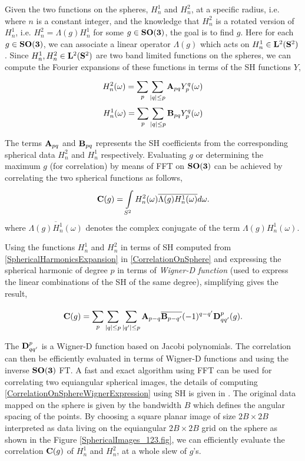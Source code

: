 \documentclass{UCF_ETD}
\begin{document}
Given the two functions on the spheres, $H^1_n$ and $H^2_n$, at a specific radius, i.e. where $n$ is a constant integer, and the knowledge that $H^2_n$ is a rotated version of $H^1_n$, i.e. $ H^2_n = \Lambda(g) H^1_n $ for some $g\in {\bf SO(3)}$, the goal is to find $g$. Here for each $g \in {\bf SO(3)}$, we can associate a linear operator $\Lambda(g)$ which acts on $H^1_n \in {\bf L}^2({\bf S}^2)$. Since $H^1_n,H^2_n \in {\bf L}^2({\bf S}^2)$ are two band limited functions on the spheres, we can compute the Fourier expansions of these functions in terms of the SH functions $Y$,
\begin{eqnarray}\label{SphericalHarmonicsExpansion}
H^2_n(\omega) = \sum\limits_{p}^{} \sum\limits_{|q|\leq p}^{} {\bf A}_{pq}Y^q_p(\omega) \nonumber \\
H^1_n(\omega) = \sum\limits_{p}^{} \sum\limits_{|q|\leq p}^{} {\bf B}_{pq}Y^q_p(\omega) 
\end{eqnarray}
 
The terms ${\bf A}_{pq}$ and ${\bf B}_{pq}$ represents the SH coefficients from the corresponding spherical data $H^2_n$ and $H^1_n$ respectively. Evaluating $g$ or determining the maximum $g$ (for correlation) by means of FFT on ${\bf SO(3)}$ can be achieved by correlating the two spherical functions as follows, 
\begin{equation}\label{CorrelationOnSphere}
{\bf C}(g) = \int\limits_{S^2}^{}H^2_n(\omega)\overline{\Lambda(g)H^1_n(\omega)}d\omega.
\end{equation}
where $\overline{\Lambda(g)H^1_n(\omega)}$ denotes the complex conjugate of the term ${\Lambda(g)H^1_n(\omega)}$.

Using the functions $H^1_n$ and $H^2_n$  in terms of SH computed from \eqref{SphericalHarmonicsExpansion} in \eqref{CorrelationOnSphere} and expressing the spherical harmonic of degree $p$ in terms of \emph{Wigner-D function} (used to express the linear combinations of the SH of the same degree), simplifying gives the result,
 
\begin{equation}\label{CorrelationOnSphereWignerExpression}
{\bf C}(g) = \sum\limits_{p}^{} \sum\limits_{|q|\leq p}^{} \sum\limits_{|q'|\leq p}^{} {\bf A}_{p-q}\overline{{\bf B}_{p-q'}}(-1)^{q-q'}{\bf D}^p_{qq'}(g).  \\ 
\end{equation}

The ${\bf D}^p_{qq'}$ is a Wigner-D function based on Jacobi polynomials. The correlation can then be efficiently evaluated in terms of Wigner-D functions and using the inverse ${\bf SO(3)}$ FT. A fast and exact algorithm using FFT can be used for correlating two equiangular spherical images, the details of computing \eqref{CorrelationOnSphereWignerExpression} using SH  is given in \cite{Kostelec2008}. The original data mapped on the sphere is given by the bandwidth $B$ which defines the angular spacing of the points. By choosing a square planar image of size $2B \times 2B$ interpreted as data living on the equiangular $2B \times 2B$ grid on the sphere as shown in the Figure \ref{SphericalImages_123.fig}, we can efficiently evaluate the correlation ${\bf C}(g)$ of $H^1_n$ and $H^2_n$, at a whole slew of $g$'s.
\end{document}
